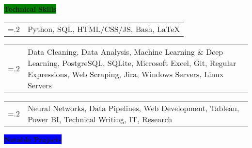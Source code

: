 \documentclass[letterpaper,12pt]{article}[leftmargin=*]
\newcommand{\skills}[2]{\vspace{4pt}
  \colorbox{Green}{\color{white}#1\hspace{9pt}\raggedbottom\normalsize\textbf{#2\hspace{4pt}}}
}
\newcommand{\projects}[2]{\vspace{4pt}
  \colorbox{Blue}{\color{white}#1\hspace{9pt}\raggedbottom\normalsize\textbf{#2\hspace{4pt}}}
}
\newcommand{\resumeSectionStart}{\begin{itemize}[leftmargin=0.1in]}
\newcommand{\resumeSectionEnd}{\end{itemize}}
\newcommand{\resumeSkill}[2]{
  \item[]
    \begin{tabularx}{0.97\textwidth}{>{\hsize=.2\hsize}X X }
      {\textbf{#1}} & {\small#2} \\
    \end{tabularx}  
    \vspace{-6pt}

}
\begin{document}

\skills{\faGears}{Technical Skills}

\resumeSectionStart{
  \resumeSkill{Languages}{Python, SQL, HTML/CSS/JS, Bash, LaTeX}
  \resumeSkill{Proficient}{Data Cleaning, Data Analysis, Machine Learning \& Deep Learning, PostgreSQL, SQLite, Microsoft Excel, Git, Regular Expressions, Web Scraping, Jira, Windows Servers, Linux Servers}
  \resumeSkill{Familiar}{Neural Networks, Data Pipelines, Web Development, Tableau, Power BI, Technical Writing, IT, Research}
}
\resumeSectionEnd{}

\projects{\faFlask}{Notable Projects}
\end{document}
